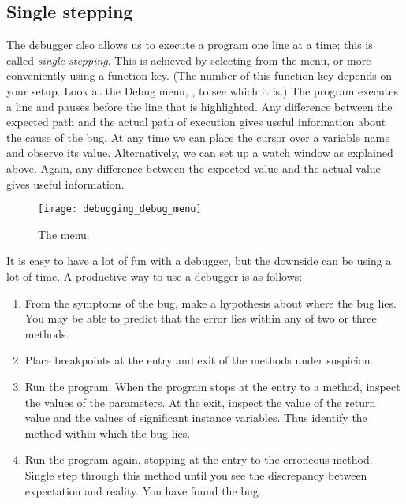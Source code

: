		\subsection*{Single stepping}
			The debugger also allows us to execute a program one line at a time; this is called \emph{single stepping}. This is achieved by selecting  from the  menu, or more conveniently using a function key. (The number of this function key depends on your setup. Look at the Debug menu, , to see which it is.) The program executes a line and pauses before the line that is highlighted. Any difference between the expected path and the actual path of execution gives useful information about the cause of the bug. At any time we can place the cursor over a variable name and observe its value. Alternatively, we can set up a watch window as explained above. Again, any difference between the expected value and the actual value gives useful information.
			\begin{figure}[bth]
				\centering
				\texttt{[image: debugging\_debug\_menu]}
				\caption{The  menu.}
				\label{fig:debugging_debug_menu}
			\end{figure}

			
			It is easy to have a lot of fun with a debugger, but the downside can be using a lot of time. A productive way to use a debugger is as follows:
			\begin{enumerate}
				\item From the symptoms of the bug, make a hypothesis about where the bug lies. You may be able to predict that the error lies within any of two or three methods.
				\item Place breakpoints at the entry and exit of the methods under suspicion.
				\item	Run the program. When the program stops at the entry to a method, inspect the values of the parameters. At the exit, inspect the value of the return value and the values of significant instance variables. Thus identify the method within which the bug lies.
				\item Run the program again, stopping at the entry to the erroneous method. Single step through this method until you see the discrepancy between expectation and reality. You have found the bug.
			\end{enumerate}



